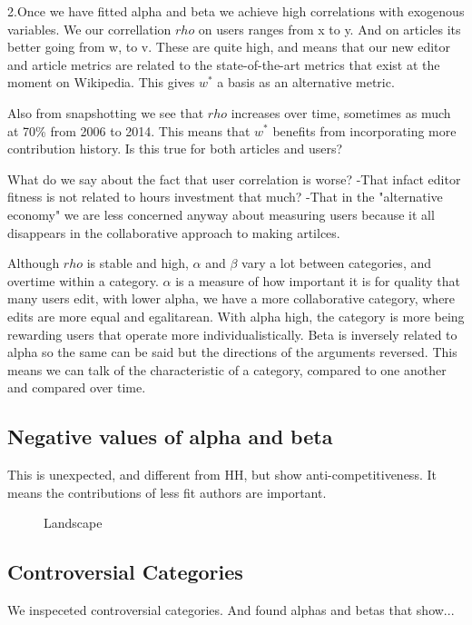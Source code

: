 \documentclass{acm_proc_article-sp}
\begin{document}
2.Once we have fitted alpha and beta we achieve high correlations with exogenous variables. We our correllation $rho$ 
 on users ranges from x to y. And on articles its better going from w, to v. These are quite high, and means that our new editor and article metrics are related to the state-of-the-art metrics that exist at the moment on Wikipedia. This gives $w^*$ a basis as an alternative metric. 
 
 Also from snapshotting we see that $rho$ increases over time, sometimes as much at 70\% from 2006 to 2014. This means that $w^*$ benefits from incorporating more contribution history.
Is this true for both articles and users?

What do we say about the fact that user correlation is worse?
-That infact editor fitness is not related to hours investment that much?
-That in the "alternative economy" we are less concerned anyway about measuring users because it all disappears in the collaborative approach to making artilces. 
 
Although $rho$ is stable and high, $\alpha$ and $\beta$ vary a lot between categories, and overtime within a category. $\alpha$ is a measure of how important it is for quality that many users edit, with lower alpha, we have a more collaborative category, where edits are more equal and egalitarean. With alpha high, the category is more being rewarding users that operate more individualistically. Beta is inversely related to alpha so the same can be said but the directions of the arguments reversed. This means we can talk of the characteristic of a category, compared to one another and compared over time. 

\subsection{Negative values of alpha and beta}
This is unexpected, and different from HH, but show anti-competitiveness. It means the contributions of less fit authors are important.

\begin{figure}[!t]
\centering
\caption{Landscape}
\label{fig:landscape}
\end{figure}

\subsection{Controversial Categories}
We inspeceted controversial categories. And found alphas and betas that show...
\end{document}
